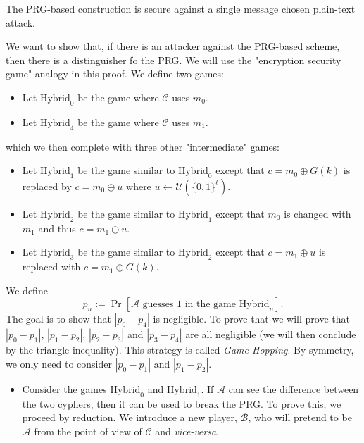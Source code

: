 \documentclass[./main]{subfiles}
\begin{document}
  \begin{prop}
    The PRG-based construction is secure against a single message chosen plain-text attack.
  \end{prop}
  \begin{prv}
    We want to show that, if there is an attacker against the PRG-based scheme, then there is a distinguisher fo the PRG.
    We will use the "encryption security game" analogy in this proof.
    We define two games:
    \begin{itemize}
      \item Let $\mathrm{Hybrid}_0$ be the game where $\mathcal{C}$ uses $m_0$.
      \item Let $\mathrm{Hybrid}_4$ be the game where $\mathcal{C}$ uses $m_1$.
    \end{itemize}
    which we then complete with three other "intermediate" games:
    \begin{itemize}
      \item Let $\mathrm{Hybrid}_1$ be the game similar to $\mathrm{Hybrid}_0$ except that $c = m_0 \oplus G(k)$ is replaced by $c = m_0 \oplus u$ where $u \gets \mathcal{U}(\{0,1\}^\ell)$.
      \item Let $\mathrm{Hybrid}_2$ be the game similar to $\mathrm{Hybrid}_1$ except that $m_0$ is changed with $m_1$ and thus $c = m_1 \oplus u$.
      \item Let $\mathrm{Hybrid}_3$ be the game similar to $\mathrm{Hybrid}_2$ except that $c = m_1 \oplus u$ is replaced with $c = m_1 \oplus G(k)$.
    \end{itemize}
    We define \[
      p_n := \Pr[\mathcal{A} \text{ guesses $1$ in the game } \mathrm{Hybrid}_n]
    .\] 
    The goal is to show that $|p_0 - p_4|$ is negligible.
    To prove that we will prove that $|p_0 - p_1|$, $|p_1 - p_2|$, $|p_2 - p_3|$ and $|p_3 - p_4|$ are all negligible (we will then conclude by the triangle inequality).
    This strategy is called \textit{Game Hopping}.
    By symmetry, we only need to consider $|p_0 - p_1|$ and $|p_1 - p_2|$.

    \begin{itemize}
      \item Consider the games $\mathrm{Hybrid}_0$ and $\mathrm{Hybrid}_1$.
        If $\mathcal{A}$ can see the difference between the two cyphers, then it can be used to break the PRG.
        To prove this, we proceed by reduction.
        We introduce a new player, $\mathcal{B}$, who will pretend to be $\mathcal{A}$ from the point of view of $\mathcal{C}$ and \textit{vice-versa}.


\end{itemize}
\end{prv}
\end{document}
